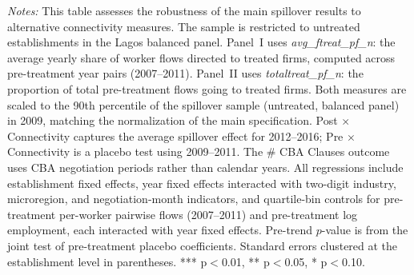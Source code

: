 \begin{table}[H]
\begin{threeparttable}
\scriptsize
\begin{tablenotes}
\item \textit{Notes:} This table assesses the robustness of the main spillover results to alternative connectivity measures. The sample is restricted to untreated establishments in the Lagos balanced panel. Panel~I uses \textit{avg\_ftreat\_pf\_n}: the average yearly share of worker flows directed to treated firms, computed across pre-treatment year pairs (2007--2011). Panel~II uses \textit{totaltreat\_pf\_n}: the proportion of total pre-treatment flows going to treated firms. Both measures are scaled to the 90th percentile of the spillover sample (untreated, balanced panel) in 2009, matching the normalization of the main specification. Post $\times$ Connectivity captures the average spillover effect for 2012--2016; Pre $\times$ Connectivity is a placebo test using 2009--2011. The \# CBA Clauses outcome uses CBA negotiation periods rather than calendar years. All regressions include establishment fixed effects, year fixed effects interacted with two-digit industry, microregion, and negotiation-month indicators, and quartile-bin controls for pre-treatment per-worker pairwise flows (2007--2011) and pre-treatment log employment, each interacted with year fixed effects. Pre-trend $p$-value is from the joint test of pre-treatment placebo coefficients. Standard errors clustered at the establishment level in parentheses. *** p$<$0.01, ** p$<$0.05, * p$<$0.10.
\end{tablenotes}
\end{threeparttable}
\end{table}